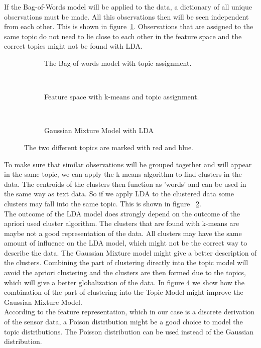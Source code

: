 \documentclass[11pt,a4paper]{article}
\begin{document}
If the Bag-of-Words model will be applied to the data, a dictionary of all unique observations must be made. All this observations then will be seen independent from each other. This is shown in figure~\ref{fig:FSBOW}. Observations that are assigned to the same topic do not need to lie close to each other in the feature space and the correct topics might not be found with LDA.

\begin{figure}[h!]
\centering
\begin{subfigure}[b]{0.3\linewidth}
\centering
\def\svgwidth{140pt}

\caption{The Bag-of-words model with topic assignment.}
\label{fig:FSBOW}
\end{subfigure}
~
\begin{subfigure}[b]{0.3\linewidth}
\centering
\def\svgwidth{140pt}

\caption{Feature space with k-means and topic assignment.}
\label{fig:FSk-means}
\end{subfigure}
~
\begin{subfigure}[b]{0.3\textwidth}
\centering
\def\svgwidth{140pt}

\caption{Gaussian Mixture Model with LDA}
\label{fig:GMM+LDA}
\end{subfigure}
\caption{The two different topics are marked with red and blue.}
\end{figure}

To make sure that similar observations will be grouped together and will appear in the same topic, we can apply the k-means algorithm to find clusters in the data. The centroids of the clusters then function as 'words' and can be used in the same way as text data. So if we apply LDA to the clustered data some clusters may fall into the same topic. This is shown in figure ~\ref{fig:FSk-means}.\\
The outcome of the LDA model does strongly depend on the outcome of the apriori used cluster algorithm. The clusters that are found with k-means are maybe not a good representation of the data. All clusters may have the same amount of influence on the LDA model, which might not be the correct way to describe the data. The Gaussian Mixture model might give a better description of the clusters. Combining the part of clustering directly into the topic model will avoid the apriori clustering and the clusters are then formed due to the topics, which will give a better globalization of the data. In figure \ref{fig:GMM+LDA} we show how the combination of the part of clustering into the Topic Model might improve the Gaussian Mixture Model.\\
According to the feature representation, which in our case is a discrete derivation of the sensor data, a Poison distribution might be a good choice to model the topic distributions. The Poisson distribution can be used instead of the Gaussian distribution.
\end{document}
